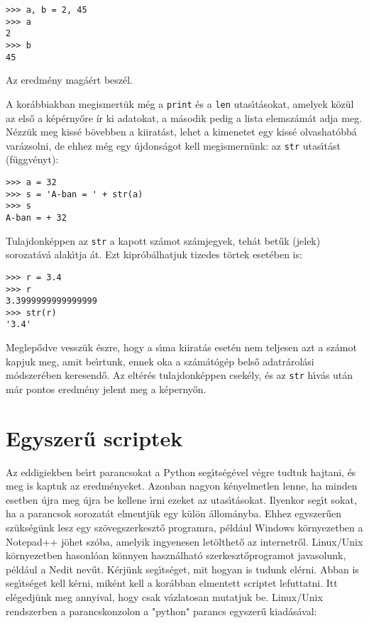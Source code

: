 \documentclass[12pt]{article}
\begin{document}
\begin{Verbatim}[fontsize=\small]
>>> a, b = 2, 45
>>> a
2
>>> b
45
\end{Verbatim}

Az eredm\'eny mag\'a\'ert besz\'el.

A kor\'abbiakban megismert\"uk m\'eg a {\tt print} \'es a {\tt len} utas\'{\i}t\'asokat, amelyek k\"oz\"ul 
az els\H{o} a k\'ep\'erny\H{o}re \'ir ki adatokat, a m\'asodik pedig a lista elemsz\'am\'at adja meg. 
N\'ezz\"uk meg kiss\'e b\"ovebben a kiirat\'ast, lehet a kimenetet egy kiss\'e olvashat\'obb\'a 
var\'azsolni, de ehhez m\'eg egy \'ujdons\'agot kell megismern\"unk: az {\tt str} utas\'{\i}t\'ast 
(f\"ugg\-v\'enyt):

\begin{Verbatim}[fontsize=\small]
>>> a = 32
>>> s = 'A-ban = ' + str(a)
>>> s
A-ban = + 32
\end{Verbatim}

Tulajdonk\'eppen az {\tt str} a kapott sz\'amot sz\'amjegyek, teh\'at bet\H{u}k (jelek) sorozat\'av\'a 
alak\'{\i}tja \'at. Ezt kipr\'ob\'alhatjuk tizedes t\"ortek eset\'eben is:

\begin{Verbatim}[fontsize=\small]
>>> r = 3.4
>>> r
3.3999999999999999
>>> str(r)
'3.4'
\end{Verbatim}

Meglep\H{o}dve vessz\"uk \'eszre, hogy a s\'{\i}ma kiirat\'as eset\'en nem teljesen azt a sz\'amot 
kapjuk meg, amit be\'{\i}rtunk, ennek oka a sz\'am\'at\'og\'ep bels\H{o} adatr\'arol\'asi m\'odszer\'eben 
keresend\H{o}. Az elt\'er\'es tulajdonk\'eppen csek\'ely, \'es az {\tt str} h\'{\i}v\'as ut\'an m\'ar 
pontos eredm\'eny jelent meg a k\'eperny\H{o}n. 

\section{Egyszer\H{u} scriptek}

Az eddigiekben be\'{\i}rt parancsokat a Python seg\'{\i}ts\'eg\'evel v\'egre tudtuk hajtani, \'es meg is 
kaptuk az eredm\'enyeket. Azonban nagyon k\'enyelmetlen lenne, ha minden esetben \'ujra meg \'ujra be kellene 
\'{\i}rni ezeket az utas\'{\i}t\'asokat. Ilyenkor seg\'{\i}t sokat, ha a parancsok sorozat\'at elmentj\"uk 
egy k\"ul\"on \'allom\'anyba. Ehhez egyszer\H{u}en sz\"uks\'eg\"unk lesz egy sz\"ovegszerkeszt\H{o} programra, 
p\'eld\'aul Windows k\"ornyezetben a Notepad++ j\"ohet sz\'oba, amelyik ingyenesen let\"olthet\H{o} az 
internetr\H{o}l. Linux/Unix k\"ornyezetben hasonl\'oan k\"onnyen haszn\'alhat\'o szerkeszt\H{o}programot 
javasolunk, p\'el\-d\'a\-ul a Nedit nev\H{u}t. K\'erj\"unk seg\'{\i}ts\'eget, mit hogyan is tudunk el\'erni. Abban 
is seg\'{\i}ts\'eget kell k\'erni, mik\'ent kell a kor\'abban elmentett scriptet lefuttatni. Itt el\'egedj\"unk 
meg annyival, hogy csak v\'azlatosan mutatjuk be. Linux/Unix rendszerben a parancskonzolon a "python" parancs 
egyszer\H{u} kiad\'as\'aval:
\end{document}
